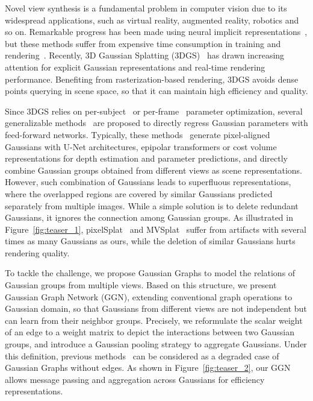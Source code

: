 Novel view synthesis is a fundamental problem in computer vision due to its widespread applications, such as virtual reality, augmented reality, robotics and so on. Remarkable progress has been made using neural implicit representations~\cite{NeRF2021ACM, LFN2021NIPS, SRN2019NIPS}, but these methods suffer from expensive time consumption in training and rendering~\cite{NSVF2020NIPS, FastNeRF2021ICCV, MipNeRF2021ICCV, KiloNeRF2021ICCV, PlenOctree2021CVPR, Plenoxels2022CVPR, EfficientNeRF2022CVPR, InstantNGP2022TOG}.
Recently, 3D Gaussian Splatting (3DGS)~\cite{3DGS2023ToG} has drawn increasing attention for explicit Gaussian representations and real-time rendering performance. Benefiting from rasterization-based rendering, 3DGS avoids dense points querying in scene space, so that it can maintain high efficiency and quality. 

Since 3DGS relies on per-subject~\cite{3DGS2023ToG} or per-frame~\cite{Dynamic3DGS2023arXiv} parameter optimization, several generalizable methods~\cite{GPSGaussian2023arXiv, MVSplat2024arXiv, pixelSplat2023arXiv, SplatterImage2023arXiv} are proposed to directly regress Gaussian parameters with feed-forward networks. 
Typically, these methods~\cite{MVSplat2024arXiv, pixelSplat2023arXiv} generate pixel-aligned Gaussians with U-Net architectures, epipolar transformers or cost volume representations for depth estimation and parameter predictions, and directly combine Gaussian groups obtained from different views as scene representations.
However, such combination of Gaussians leads to superfluous representations, where the overlapped regions are covered by similar Gaussians predicted separately from multiple images. 
While a simple solution is to delete redundant Gaussians, it ignores the connection among Gaussian groups. As illustrated in Figure~\ref{fig:teaser_1}, pixelSplat~\cite{pixelSplat2023arXiv} and MVSplat~\cite{MVSplat2024arXiv} suffer from artifacts with several times as many Gaussians as ours, while the deletion of similar Gaussians hurts rendering quality. 

To tackle the challenge, we propose Gaussian Graphs to model the relations of Gaussian groups from multiple views. 
Based on this structure, we present Gaussian Graph Network (GGN), extending conventional graph operations to Gaussian domain, so that Gaussians from different views are not independent but can learn from their neighbor groups.
Precisely, we reformulate the scalar weight of an edge to a weight matrix to depict the interactions between two Gaussian groups, and introduce a Gaussian pooling strategy to aggregate Gaussians.  
Under this definition, previous methods~\cite{pixelSplat2023arXiv, MVSplat2024arXiv} can be considered as a degraded case of Gaussian Graphs without edges. 
As shown in Figure~\ref{fig:teaser_2}, our GGN allows message passing and aggregation across Gaussians for efficiency representations. 

